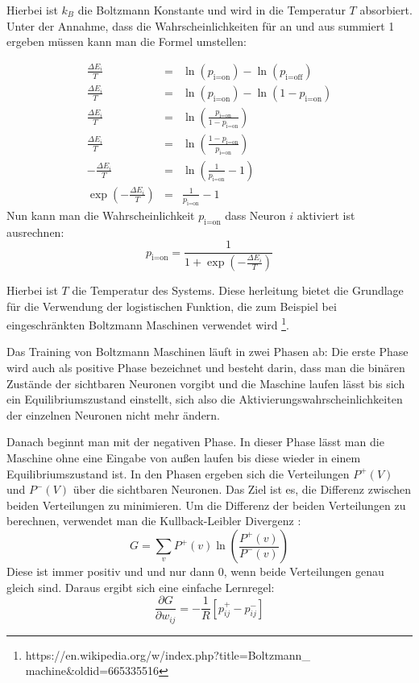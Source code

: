 \documentclass[12pt]{article}
\begin{document}
 Hierbei ist $k_B$ die Boltzmann Konstante und wird in die Temperatur $T$ absorbiert. Unter der Annahme, dass die Wahrscheinlichkeiten für an und aus summiert 1 ergeben müssen kann man die Formel umstellen:
 
 \begin{eqnarray}
 \frac{\Delta E_i}{T} &=& \ln(p_\text{i=on}) - \ln(p_\text{i=off})\\\nonumber
\frac{\Delta E_i}{T} &=& \ln(p_\text{i=on}) - \ln(1 - p_\text{i=on})\\\nonumber
\frac{\Delta E_i}{T} &=& \ln\left(\frac{p_\text{i=on}}{1 - p_\text{i=on}}\right)\\\nonumber
\frac{\Delta E_i}{T} &=& \ln\left(\frac{1 - p_\text{i=on}}{p_\text{i=on}}\right)\\\nonumber
-\frac{\Delta E_i}{T} &=& \ln\left(\frac{1}{p_\text{i=on}} - 1\right)\\\nonumber
\exp\left(-\frac{\Delta E_i}{T}\right) &=& \frac{1}{p_\text{i=on}} - 1
 \end{eqnarray}
Nun kann man die Wahrscheinlichkeit $p_\text{i=on}$ dass Neuron $i$ aktiviert ist ausrechnen:
\begin{equation}
p_\text{i=on} = \frac{1}{1+\exp(-\frac{\Delta E_i}{T})}
\end{equation}

Hierbei ist $T$ die Temperatur des Systems. Diese herleitung bietet die Grundlage für die Verwendung der logistischen Funktion, die zum Beispiel bei eingeschränkten Boltzmann Maschinen verwendet wird \footnote{https://en.wikipedia.org/w/index.php?title=Boltzmann\_ machine\&oldid=665335516}. 

Das Training von Boltzmann Maschinen läuft in zwei Phasen ab: Die erste Phase wird auch als positive Phase bezeichnet und besteht darin, dass man die binären Zustände der sichtbaren Neuronen vorgibt und die Maschine laufen lässt bis sich ein Equilibriumszustand einstellt, sich also die Aktivierungswahrscheinlichkeiten der einzelnen Neuronen nicht mehr ändern. 

Danach beginnt man mit der negativen Phase. In dieser Phase lässt man die Maschine ohne eine Eingabe von außen laufen bis diese wieder in einem Equilibriumszustand ist. In den Phasen ergeben sich die Verteilungen $P^+(V)$ und $P^-(V)$ über die sichtbaren Neuronen. Das Ziel ist es, die Differenz zwischen beiden Verteilungen zu minimieren. Um die Differenz der beiden Verteilungen zu berechnen, verwendet man die Kullback-Leibler Divergenz \cite{KLD}:
\begin{equation}
G = \sum_{v}{P^{+}(v)\ln\left({\frac{P^{+}(v)}{P^{-}(v)}}\right)}
\end{equation} 
Diese ist immer positiv und und nur dann 0, wenn beide Verteilungen genau gleich sind. Daraus ergibt sich eine einfache Lernregel:
\begin{equation}
\frac{\partial{G}}{\partial{w_{ij}}} = -\frac{1}{R}[p_{ij}^{+}-p_{ij}^{-}]
\end{equation}
\end{document}
